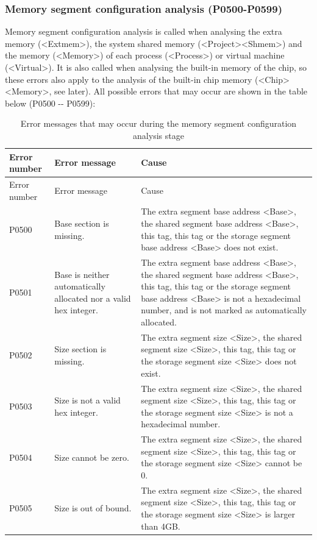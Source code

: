\subsubsection{Memory segment configuration analysis (P0500-P0599)}\label{subsubsec:5-6-2-6}

Memory segment configuration analysis is called when analysing the extra memory (<Extmem>), the system shared memory (<Project><Shmem>) and the memory (<Memory>) of each process (<Process>) or virtual machine (<Virtual>). It is also called when analysing the built-in memory of the chip, so these errors also apply to the analysis of the built-in chip memory (<Chip><Memory>, see later). All possible errors that may occur are shown in the table below (P0500
-\/- P0599):

\begin{xltabular}{\textwidth}{@{}>{\hsize\raggedright\arraybackslash}X>{\hsize\raggedright\arraybackslash}X>{\hsize\raggedright\arraybackslash}X@{}}
\caption{Error messages that may occur during the memory segment configuration analysis stage}\label{tab:5-8}\\
\toprule
Error number & Error message & Cause\tabularnewline
\endfirsthead
\toprule
Error number & Error message & Cause\tabularnewline
\midrule
\endhead
\bottomrule
\endlastfoot
P0500 & Base section is missing. &
The extra segment base address <Base>, the shared segment base address <Base>, this tag, this tag or the storage segment base address <Base> does not exist.\tabularnewline
P0501 & Base is neither automatically allocated nor a valid hex integer.
&
The extra segment base address <Base>, the shared segment base address <Base>, this tag, this tag or the storage segment base address <Base> is not a hexadecimal number, and is not marked as automatically allocated.\tabularnewline
P0502 & Size section is missing. &
The extra segment size <Size>, the shared segment size <Size>, this tag, this tag or the storage segment size <Size> does not exist.\tabularnewline
P0503 & Size is not a valid hex integer. &
The extra segment size <Size>, the shared segment size <Size>, this tag, this tag or the storage segment size <Size> is not a hexadecimal number.\tabularnewline
P0504 & Size cannot be zero. &
The extra segment size <Size>, the shared segment size <Size>, this tag, this tag or the storage segment size <Size> cannot be 0.\tabularnewline
P0505 & Size is out of bound. &
The extra segment size <Size>, the shared segment size <Size>, this tag, this tag or the storage segment size <Size> is larger than 4GB.\tabularnewline

\end{xltabular}
